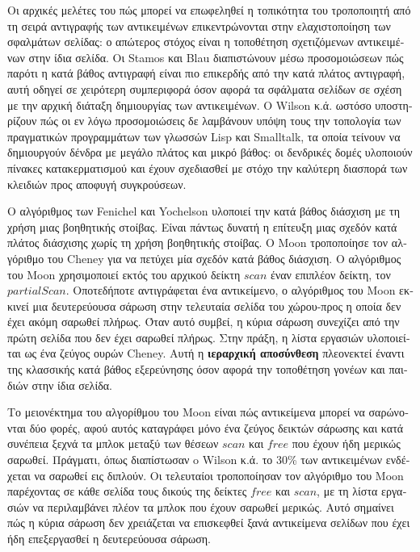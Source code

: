 \begin{greek}
Οι αρχικές μελέτες του πώς μπορεί να επωφεληθεί η τοπικότητα
του τροποποιητή από τη σειρά αντιγραφής των αντικειμένων επικεντρώνονται
στην ελαχιστοποίηση των σφαλμάτων σελίδας: ο απώτερος στόχος 
είναι η τοποθέτηση σχετιζόμενων αντικειμένων στην ίδια σελίδα.
Οι Stamos \cite{stamos1982large, DBLP:journals/tocs/Stamos84}
και Blau \cite{DBLP:journals/pe/Blau83} διαπιστώνουν μέσω προσομοιώσεων
πώς παρότι η κατά βάθος αντιγραφή είναι πιο επικερδής από την
κατά πλάτος αντιγραφή, αυτή οδηγεί σε χειρότερη συμπεριφορά όσον
αφορά τα σφάλματα σελίδων σε σχέση με την αρχική διάταξη δημιουργίας
των αντικειμένων. Ο Wilson κ.ά. \cite{DBLP:conf/pldi/WilsonLM91}
ωστόσο υποστηρίζουν πώς οι εν λόγω προσομοιώσεις δε λαμβάνουν
υπόψη τους την τοπολογία των πραγματικών προγραμμάτων των γλωσσών
Lisp και Smalltalk, τα οποία τείνουν να δημιουργούν δένδρα με
μεγάλο πλάτος και μικρό βάθος: οι δενδρικές δομές υλοποιούν
πίνακες κατακερματισμού και έχουν σχεδιασθεί με στόχο την καλύτερη
διασπορά των κλειδιών προς αποφυγή συγκρούσεων.

Ο αλγόριθμος των Fenichel και Yochelson υλοποιεί την κατά βάθος
διάσχιση με τη χρήση μιας βοηθητικής στοίβας. Είναι πάντως δυνατή
η επίτευξη μιας σχεδόν κατά πλάτος διάσχισης χωρίς τη χρήση
βοηθητικής στοίβας. Ο Moon \cite{DBLP:conf/lfp/Moon84} τροποποίησε
τον αλγόριθμο του Cheney για να πετύχει μία σχεδόν κατά βάθος
διάσχιση. Ο αλγόριθμος του Moon χρησιμοποιεί εκτός του αρχικού
δείκτη $scan$ έναν επιπλέον δείκτη, τον $partialScan$. Οποτεδήποτε
αντιγράφεται ένα αντικείμενο, ο αλγόριθμος του Moon εκκινεί μια
δευτερεύουσα σάρωση στην τελευταία σελίδα του χώρου-προς η οποία
δεν έχει ακόμη σαρωθεί πλήρως. Όταν αυτό συμβεί, η κύρια σάρωση
συνεχίζει από την πρώτη σελίδα που δεν έχει σαρωθεί πλήρως. Στην
πράξη, η λίστα εργασιών υλοποιείται ως ένα ζεύγος ουρών Cheney.
Αυτή η \textbf{ιεραρχική αποσύνθεση} πλεονεκτεί έναντι της κλασσικής
κατά βάθος εξερεύνησης όσον αφορά την τοποθέτηση γονέων και
παιδιών στην ίδια σελίδα.

Το μειονέκτημα του αλγορίθμου του Moon είναι πώς αντικείμενα
μπορεί να σαρώνονται δύο φορές, αφού αυτός καταγράφει μόνο ένα
ζεύγος δεικτών σάρωσης και κατά συνέπεια ξεχνά τα μπλοκ μεταξύ
των θέσεων $scan$ και $free$ που έχουν ήδη μερικώς σαρωθεί.
Πράγματι, όπως διαπίστωσαν o Wilson κ.ά. \cite{DBLP:conf/pldi/WilsonLM91}
το 30\% των αντικειμένων ενδέχεται να σαρωθεί εις διπλούν. Οι
τελευταίοι τροποποίησαν τον αλγόριθμο του Moon παρέχοντας σε
κάθε σελίδα τους δικούς της δείκτες $free$ και $scan$, με τη
λίστα εργασιών να περιλαμβάνει πλέον τα μπλοκ που έχουν σαρωθεί
μερικώς. Αυτό σημαίνει πώς η κύρια σάρωση δεν χρειάζεται να
επισκεφθεί ξανά αντικείμενα σελίδων που έχει ήδη επεξεργασθεί
η δευτερεύουσα σάρωση.


\end{greek}
